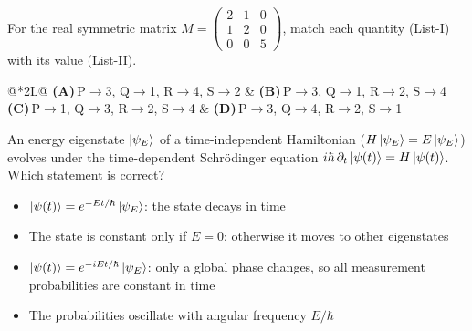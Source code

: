 \documentclass[11pt,a4paper]{article}
\newcommand{\optlabel}[1]{\textbf{(#1)}}
\newenvironment{qitem}[1]{\begin{list}{}{\setlength{\leftmargin}{3.3em}\setlength{\labelwidth}{3.1em}%
  \setlength{\labelsep}{0.2em}\setlength{\topsep}{3pt}\setlength{\parsep}{3pt}}\item[\textbf{Q.#1}\hfill]}{\end{list}}
\newcommand{\qsep}{\par\vspace{2pt}{\color{black!15}\hrule}\vspace{4pt}}
\begin{document}
\begin{qitem}{3}
For the real symmetric matrix $M = \begin{pmatrix}2 & 1 & 0\\ 1 & 2 & 0\\ 0 & 0 & 5\end{pmatrix}$, match each quantity (List-I) with its value (List-II).
\par\smallskip{}
\par\smallskip\noindent\begin{tabularx}{\linewidth}{@{}*{2}{L}@{}}
\optlabel{A}\,P$\to$3, Q$\to$1, R$\to$4, S$\to$2 & \optlabel{B}\,P$\to$3, Q$\to$1, R$\to$2, S$\to$4 \\[3pt]
\optlabel{C}\,P$\to$1, Q$\to$3, R$\to$2, S$\to$4 & \optlabel{D}\,P$\to$3, Q$\to$4, R$\to$2, S$\to$1
\end{tabularx}
\end{qitem}
\qsep

\begin{qitem}{4}
An energy eigenstate $\ket{\psi_E}$ of a time-independent Hamiltonian ($H\ket{\psi_E} = E\ket{\psi_E}$) evolves under the time-dependent
Schr\"odinger equation $i\hbar\,\partial_t\ket{\psi(t)} = H\ket{\psi(t)}$. Which statement is correct?
\begin{itemize}[leftmargin=2.6em, labelsep=0.4em, itemsep=2pt, topsep=3pt]
\item[\optlabel{A}] $\ket{\psi(t)} = e^{-Et/\hbar}\ket{\psi_E}$: the state decays in time
\item[\optlabel{B}] The state is constant only if $E = 0$; otherwise it moves to other eigenstates
\item[\optlabel{C}] $\ket{\psi(t)} = e^{-iEt/\hbar}\ket{\psi_E}$: only a global phase changes, so all measurement probabilities are constant in time
\item[\optlabel{D}] The probabilities oscillate with angular frequency $E/\hbar$
\end{itemize}
\end{qitem}
\qsep
\end{document}
